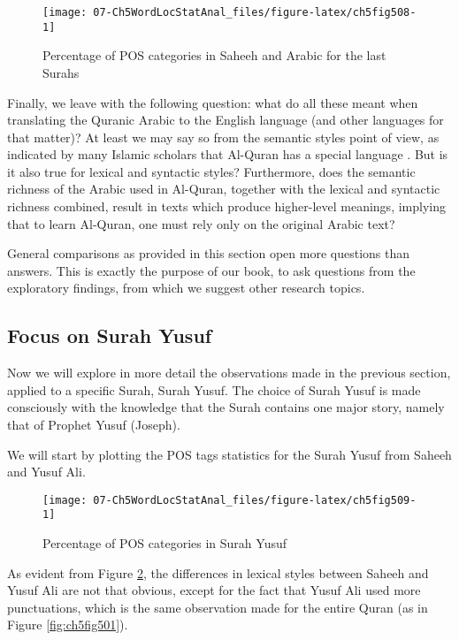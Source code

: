 \documentclass[
]{article}
\begin{document}
\begin{figure}

{\centering \texttt{[image: 07-Ch5WordLocStatAnal\_files/figure-latex/ch5fig508-1]} 

}

\caption{Percentage of POS categories in Saheeh and Arabic for the last Surahs}\label{fig:ch5fig508}
\end{figure}

Finally, we leave with the following question: what do all these meant when translating the Quranic Arabic to the English language (and other languages for that matter)? At least we may say so from the semantic styles point of view, as indicated by many Islamic scholars that Al-Quran has a special language \citep{saeh2015}. But is it also true for lexical and syntactic styles? Furthermore, does the semantic richness of the Arabic used in Al-Quran, together with the lexical and syntactic richness combined, result in texts which produce higher-level meanings, implying that to learn Al-Quran, one must rely only on the original Arabic text?

General comparisons as provided in this section open more questions than answers. This is exactly the purpose of our book, to ask questions from the exploratory findings, from which we suggest other research topics.

\hypertarget{focus-on-surah-Yusuf}{%
\subsection{Focus on Surah Yusuf}\label{focus-on-surah-Yusuf}}

Now we will explore in more detail the observations made in the previous section, applied to a specific Surah, Surah Yusuf. The choice of Surah Yusuf is made consciously with the knowledge that the Surah contains one major story, namely that of Prophet Yusuf (Joseph).

We will start by plotting the POS tags statistics for the Surah Yusuf from Saheeh and Yusuf Ali.

\begin{figure}

{\centering \texttt{[image: 07-Ch5WordLocStatAnal\_files/figure-latex/ch5fig509-1]} 

}

\caption{Percentage of POS categories in Surah Yusuf}\label{fig:ch5fig509}
\end{figure}

As evident from Figure \ref{fig:ch5fig509}, the differences in lexical styles between Saheeh and Yusuf Ali are not that obvious, except for the fact that Yusuf Ali used more punctuations, which is the same observation made for the entire Quran (as in Figure \ref{fig:ch5fig501}).
\end{document}
